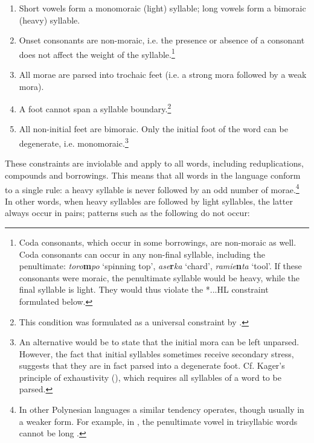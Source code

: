 \begin{enumerate}
\item 
Short vowels form a monomoraic (light) syllable; long vowels form a bimoraic (heavy) syllable.

\item 
Onset consonants are non-moraic, i.e. the presence or absence of a consonant does not affect the weight of the syllable.\footnote{\label{fn:42}Coda consonants, which occur in some borrowings, are non-moraic as well. Coda consonants can occur in any non-final syllable, including the penultimate: \textit{toro}\textbf{m}\textit{po} ‘spinning top’, \textit{ase}\textbf{r}\textit{ka} ‘chard’, \textit{ramie}\textbf{n}\textit{ta} ‘tool’. If these consonants were moraic, the penultimate syllable would be heavy, while the final syllable is light. They would thus violate the *...HL constraint formulated below.}

\item 
All morae are parsed into trochaic feet (i.e. a strong mora followed by a weak mora).

\item 
A foot cannot span a syllable boundary.\footnote{\label{fn:43}This condition was formulated as a universal constraint by \citet[50]{Hayes1995}.} 

\item 
All non-initial feet are bimoraic. Only the initial foot of the word can be degenerate, i.e. monomoraic.\footnote{\label{fn:44}An alternative would be to state that the initial mora can be left unparsed. However, the fact that initial syllables sometimes receive secondary stress, suggests that they are in fact parsed into a degenerate foot. Cf. Kager’s principle of exhaustivity (\citealt[370]{Kager1995}), which requires all syllables of a word to be parsed.} 

\end{enumerate}

These constraints are inviolable and apply to all words, including reduplications, compounds and borrowings. This means that all words in the language conform to a single rule: a heavy syllable is never followed by an odd number of morae.\footnote{\label{fn:45}In other Polynesian languages a similar tendency operates, though usually in a weaker form. For example, in , the penultimate vowel in trisyllabic words cannot be long \citep[102]{Hovdhaugen1990}.} In other words, when heavy syllables are followed by light syllables, the latter always occur in pairs; patterns such as the following do not occur: 

